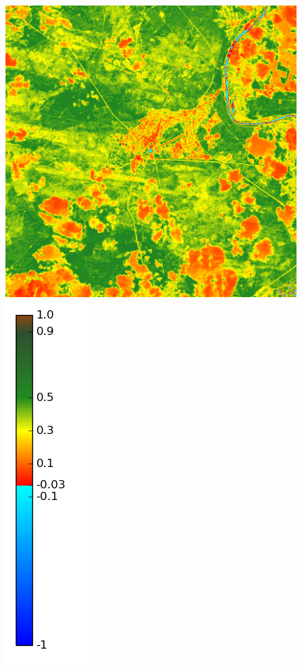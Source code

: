 \documentclass{book}
\begin{document}
\begin{figure}[H]
{\includegraphics[scale=0.2]{images/Fontainebleau/08_ndvi.png}
\includegraphics[scale=0.2]{images/colormap.png}
}
\end{figure}
\end{document}
